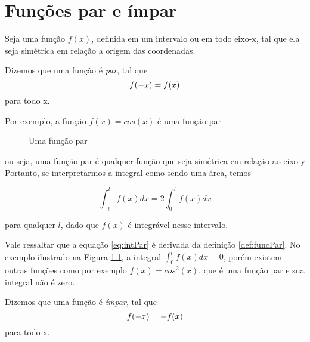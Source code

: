 \chapter{Funções par e ímpar}

Seja uma função $f(x)$, definida em um intervalo ou em todo eixo-x, 
tal que ela seja simétrica em relação a origem das coordenadas.
\\

\begin{definicao}
\label{def:funcPar}
    Dizemos que uma função é \textit{par}, tal que 
    \begin{equation}
    \notag
        f(-x) = f(x)
    \end{equation} 
    para todo x.    
\end{definicao}

Por exemplo, a função $f(x) = cos(x)$ é uma função par

\begin{figure}[H]
\begin{center}
    \caption{Uma função par}
    \label{fig:funcPar}
\end{center}
\end{figure}
ou seja, uma função par é qualquer função que seja simétrica em 
relação ao eixo-y
\\

Portanto, se interpretarmos a integral como sendo uma área, temos

\begin{equation}
\label{eq:intPar}
    \int_{-l}^{l} f(x)dx = 2\int_{0}^{l} f(x)dx
\end{equation}

para qualquer $l$, dado que $f(x)$ é integrável nesse intervalo.

Vale ressaltar que a equação \ref{eq:intPar} é derivada da definição \ref{def:funcPar}.
No exemplo ilustrado na Figura \ref{fig:funcPar}, a integral $\int_{0}^{l} f(x)dx = 0$,
porém existem outras funções como por exemplo $f(x) = cos^2(x)$, que é uma função par
e sua integral não é zero.

\begin{definicao}
\label{def:funcImpar}
    Dizemos que uma função é \textit{ímpar}, tal que 
    \begin{equation}
    \notag
        f(-x) = - f(x)
    \end{equation} 
    para todo x.    
\end{definicao}

